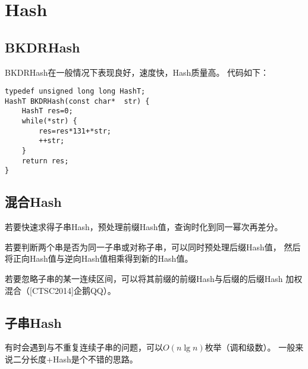 \section{Hash}
\subsection{BKDRHash}
BKDRHash在一般情况下表现良好，速度快，Hash质量高。
代码如下：
\begin{lstlisting}
typedef unsigned long long HashT;
HashT BKDRHash(const char*  str) {
    HashT res=0;
    while(*str) {
        res=res*131+*str;
        ++str;
    }
    return res;
}
\end{lstlisting}
\subsection{混合Hash}
若要快速求得子串Hash，预处理前缀Hash值，查询时化到同一幂次再差分。

若要判断两个串是否为同一子串或对称子串，可以同时预处理后缀Hash值，
然后将正向Hash值与逆向Hash值相乘得到新的Hash值。

若要忽略子串的某一连续区间，可以将其前缀的前缀Hash与后缀的后缀Hash
加权混合（[CTSC2014]企鹅QQ）。
\subsection{子串Hash}
有时会遇到与不重复连续子串的问题，可以$O(n\lg n)$枚举（调和级数）。
一般来说二分长度+Hash是个不错的思路。

